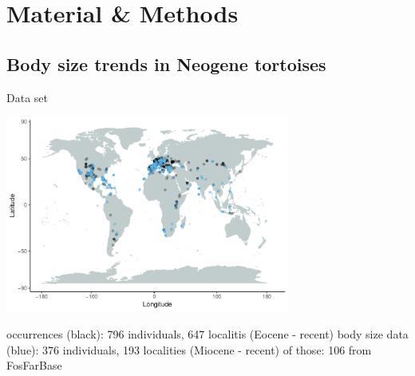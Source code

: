 \section{Material \& Methods}

\subsection{Body size trends in Neogene tortoises}

\begin{frame}{Data set}
\begin{center}
	\includegraphics[width=0.7\textwidth]{MA_JJ_files/figure-latex/MapFossilOccurrences-1.pdf}
\end{center}


\begin{itemize} %
 occurrences (black): 796 individuals, 647 localitis (Eocene - recent)
\bigskip
{} body size data (blue): 376 individuals, 193 localities (Miocene - recent)
\bigskip
{} of those: 106 from FosFarBase
\end{itemize}

\end{frame}


